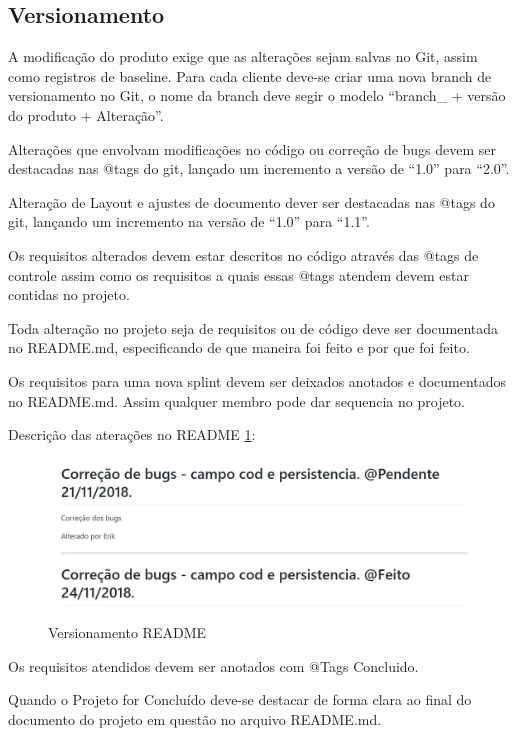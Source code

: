 \documentclass[	DIV=calc,%
							paper=a4,%
							fontsize=12pt,%
							onecolumn]{scrartcl}	 					%
\begin{document}
\subsection {Versionamento}

 A modificação do produto exige que as alterações sejam salvas no Git, assim como registros de baseline. Para cada cliente deve-se criar uma nova branch de versionamento no Git, o nome da branch deve segir o modelo “branch\_ + versão do produto + Alteração”.
 
 
 Alterações que envolvam modificações no código ou correção de bugs devem ser destacadas nas @tags do git, lançado um incremento a versão de “1.0” para “2.0”.
 
 
Alteração de Layout e ajustes de documento dever ser destacadas nas @tags  do git, lançando um incremento na versão de “1.0” para “1.1”.  
  


Os requisitos alterados devem estar descritos no código através das @tags de controle assim como os requisitos a quais essas @tags atendem devem estar contidas no projeto.


Toda alteração no projeto seja de requisitos ou de código deve ser documentada no README.md, especificando de que maneira foi feito e por que foi feito.


Os requisitos para uma nova splint devem ser deixados anotados e documentados no README.md.  Assim qualquer membro pode dar sequencia no projeto.


Descrição das aterações no README \ref{rup12}: 
 \begin{figure}[h!]
    \centering
	\includegraphics[scale=0.4]{readme.png}
	\caption{Versionamento README}
	\label{rup12}
\end{figure}

Os requisitos atendidos devem ser anotados com @Tags Concluido.


Quando o Projeto for Concluído deve-se destacar de forma clara ao final do documento do projeto em questão no arquivo README.md.
\end{document}
